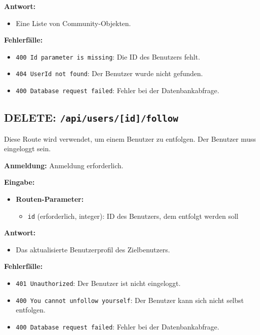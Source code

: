 \documentclass[a4paper,12pt]{article}
\begin{document}
\textbf{Antwort:}
\begin{itemize}
    \item Eine Liste von Community-Objekten.
\end{itemize}

\textbf{Fehlerfälle:}
\begin{itemize}
    \item \texttt{400 Id parameter is missing}:
        Die ID des Benutzers fehlt.
    \item \texttt{404 UserId not found}:
        Der Benutzer wurde nicht gefunden.
    \item \texttt{400 Database request failed}:
        Fehler bei der Datenbankabfrage.
\end{itemize}

\subsection{DELETE: \texttt{/api/users/[id]/follow}}

Diese Route wird verwendet, um einem Benutzer zu entfolgen. Der Benutzer muss
eingeloggt sein.

\textbf{Anmeldung:} Anmeldung erforderlich.

\textbf{Eingabe:}
\begin{itemize}
    \item \textbf{Routen-Parameter:}
    \begin{itemize}
        \item \texttt{id} (erforderlich, integer):
            ID des Benutzers, dem entfolgt werden soll
    \end{itemize}
\end{itemize}

\textbf{Antwort:}
\begin{itemize}
    \item Das aktualisierte Benutzerprofil des Zielbenutzers.
\end{itemize}

\textbf{Fehlerfälle:}
\begin{itemize}
    \item \texttt{401 Unauthorized}:
        Der Benutzer ist nicht eingeloggt.
    \item \texttt{400 You cannot unfollow yourself}:
        Der Benutzer kann sich nicht selbst entfolgen.
    \item \texttt{400 Database request failed}:
        Fehler bei der Datenbankabfrage.
\end{itemize}
\end{document}
